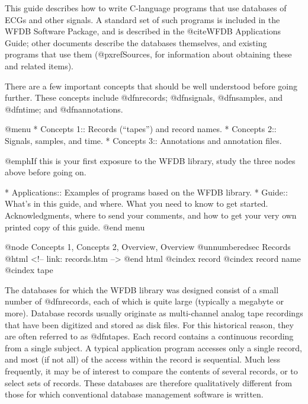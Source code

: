 This guide describes how to write C-language programs that use databases
of ECGs and other signals.  A standard set of such programs is included
in the WFDB Software Package, and is described in the @cite{WFDB
Applications Guide}; other documents describe the databases themselves,
and existing programs that use them (@pxref{Sources}, for information
about obtaining these and related items).

There are a few important concepts that should be well understood before
going further.  These concepts include @dfn{records}; @dfn{signals},
@dfn{samples}, and @dfn{time}; and @dfn{annotations}.

@menu
* Concepts 1::			Records (``tapes'') and record names.
* Concepts 2::			Signals, samples, and time.
* Concepts 3::			Annotations and annotation files.

@emph{If this is your first exposure to the WFDB library,
study the three nodes above before going on.}

* Applications::		Examples of programs based on the WFDB library.
* Guide::			What's in this guide, and where.
                		What you need to know to get started.
				Acknowledgments, where to send your
				comments, and how to get your very own
				printed copy of this guide.
@end menu

@node     Concepts 1, Concepts 2, Overview, Overview
@unnumberedsec Records
@html
<!-- link: records.htm -->
@end html
@cindex record
@cindex record name
@cindex tape

The databases for which the WFDB library was designed consist of a small
number of @dfn{records}, each of which is quite large (typically a
megabyte or more).  Database records usually originate as multi-channel
analog tape recordings that have been digitized and stored as disk
files.  For this historical reason, they are often referred to as
@dfn{tapes}.  Each record contains a continuous recording from a single
subject.  A typical application program accesses only a single record,
and most (if not all) of the access within the record is sequential.
Much less frequently, it may be of interest to compare the contents of
several records, or to select sets of records.  These databases are
therefore qualitatively different from those for which conventional
database management software is written.

